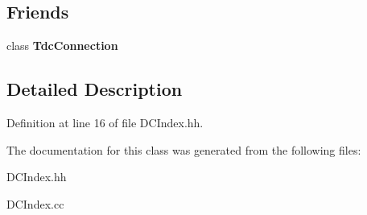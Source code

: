 \subsection*{Friends}
\begin{DoxyCompactItemize}
\item 
class {\bfseries TdcConnection}\label{classCALICE_1_1DCIndex_ab85618aade64e98c6f7945f78e721566}

\end{DoxyCompactItemize}


\subsection{Detailed Description}


Definition at line 16 of file DCIndex.hh.

The documentation for this class was generated from the following files:\begin{DoxyCompactItemize}
\item 
DCIndex.hh\item 
DCIndex.cc\end{DoxyCompactItemize}
